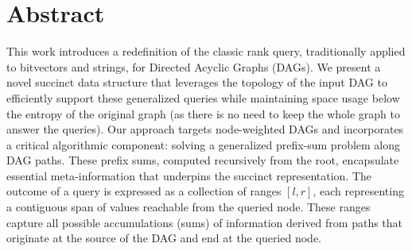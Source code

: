 


\begingroup
\let\clearpage\relax
\let\cleardoublepage\relax
\let\cleardoublepage\relax

\chapter*{Abstract}
This work introduces a redefinition of the classic rank query, traditionally applied to bitvectors and strings, for Directed Acyclic Graphs (DAGs). We present a novel succinct data structure that leverages the topology of the input DAG to efficiently support these generalized queries while maintaining space usage below the entropy of the original graph (as there is no need to keep the whole graph to answer the queries). Our approach targets node-weighted DAGs and incorporates a critical algorithmic component: solving a generalized prefix-sum problem along DAG paths. These prefix sums, computed recursively from the root, encapsulate essential meta-information that underpins the succinct representation. The outcome of a query is expressed as a collection of ranges \([l, r]\), each representing a contiguous span of values reachable from the queried node. These ranges capture all possible accumulations (sums) of information derived from paths that originate at the source of the DAG and end at the queried node.
\endgroup

\vfill
